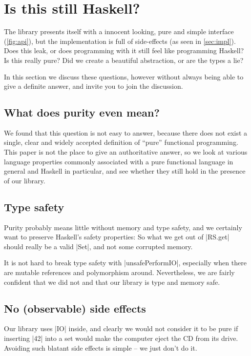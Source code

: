 \documentclass[manuscript,review,screen,acmsmall]{acmart}
\begin{document}
\section{Is this still Haskell?}\label{sec:pure}

The library presents itself with a innocent looking, pure and simple interface (\cref{fig:api}), but the implementation is full of side-effects (as seen in \cref{sec:impl}).
Does this leak, or does programming with it still feel like programming Haskell?
Is this really pure? Did we create a beautiful abstraction, or are the types a lie?

In this section we discuss these questions, however without always being able to give a definite answer, and invite you to join the discussion.

\subsection{What does purity even mean?}

We found that this question is not easy to answer, because there does not exist a single, clear and widely accepted definition of “pure” functional programming.
This paper is not the place to give an authoritative answer, so we look at various language properties commonly associated with a pure functional language in general and Haskell in particular,
and see whether they still hold in the presence of our library.

\subsection{Type safety}

Purity probably means little without memory and type safety, and we certainly want to preserve Haskell's safety properties: So what we get out of |RS.get| should really be a valid |Set|, and not some corrupted memory.

It is not hard to break type safety with |unsafePerformIO|, especially when there are mutable references and polymorphism around. Nevertheless, we are fairly confident that we did not and that our library is type and memory safe.

\subsection{No (observable) side effects}

Our library uses |IO| inside, and clearly we would not consider it to be pure if inserting |42| into a set would make the computer eject the CD from its drive. Avoiding such blatant side effects is simple -- we just don't do it.
\end{document}
